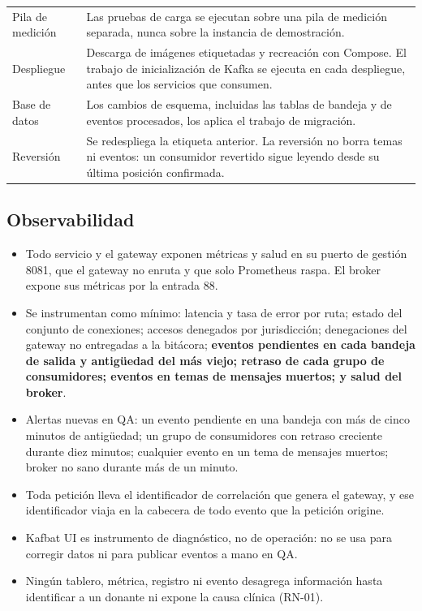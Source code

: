 \documentclass[11pt,a4paper]{article}
\begin{document}
\begin{longtable}{L{3.9cm} L{10.7cm}}
Pila de medición & Las pruebas de carga se ejecutan sobre una pila de medición separada, nunca sobre la instancia de demostración. \\
Despliegue & Descarga de imágenes etiquetadas y recreación con Compose. El trabajo de inicialización de Kafka se ejecuta en cada despliegue, antes que los servicios que consumen. \\
Base de datos & Los cambios de esquema, incluidas las tablas de bandeja y de eventos procesados, los aplica el trabajo de migración. \\
Reversión & Se redespliega la etiqueta anterior. La reversión no borra temas ni eventos: un consumidor revertido sigue leyendo desde su última posición confirmada. \\
\end{longtable}

\subsection{Observabilidad}
\label{sec:observabilidad}

\begin{itemize}
\item Todo servicio y el gateway exponen métricas y salud en su puerto de gestión 8081, que el gateway no enruta y que solo Prometheus raspa. El broker expone sus métricas por la entrada 88.
\item Se instrumentan como mínimo: latencia y tasa de error por ruta; estado del conjunto de conexiones; accesos denegados por jurisdicción; denegaciones del gateway no entregadas a la bitácora; \textbf{eventos pendientes en cada bandeja de salida y antigüedad del más viejo; retraso de cada grupo de consumidores; eventos en temas de mensajes muertos; y salud del broker}.
\item Alertas nuevas en QA: un evento pendiente en una bandeja con más de cinco minutos de antigüedad; un grupo de consumidores con retraso creciente durante diez minutos; cualquier evento en un tema de mensajes muertos; broker no sano durante más de un minuto.
\item Toda petición lleva el identificador de correlación que genera el gateway, y ese identificador viaja en la cabecera de todo evento que la petición origine.
\item Kafbat UI es instrumento de diagnóstico, no de operación: no se usa para corregir datos ni para publicar eventos a mano en QA.
\item Ningún tablero, métrica, registro ni evento desagrega información hasta identificar a un donante ni expone la causa clínica (RN-01).
\end{itemize}
\end{document}
